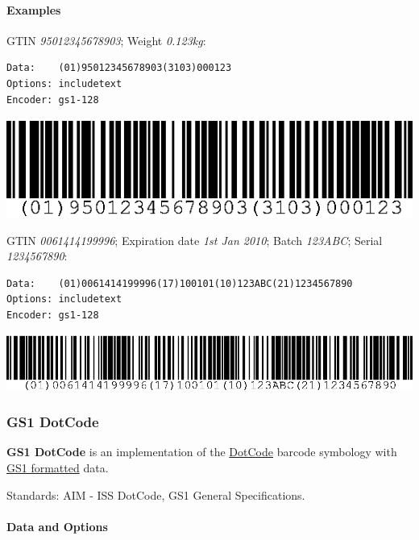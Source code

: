 \hypertarget{examples-22}{%
\paragraph{Examples}\label{examples-22}}

GTIN \emph{95012345678903}; Weight \emph{0.123kg}:

\begin{verbatim}
Data:    (01)95012345678903(3103)000123
Options: includetext
Encoder: gs1-128
\end{verbatim}

\includegraphics{images/ean128-1.eps}

GTIN \emph{0061414199996}; Expiration date \emph{1st Jan 2010}; Batch
\emph{123ABC}; Serial \emph{1234567890}:

\begin{verbatim}
Data:    (01)0061414199996(17)100101(10)123ABC(21)1234567890
Options: includetext
Encoder: gs1-128
\end{verbatim}

\includegraphics{images/ean128-2.eps}

\hypertarget{gs1-dotcode}{%
\subsubsection{GS1 DotCode}\label{gs1-dotcode}}

\textbf{GS1 DotCode} is an implementation of the
\protect\hyperlink{dotcode}{DotCode} barcode symbology with
\protect\hyperlink{gs1-application-identifier-standard-format}{GS1
formatted} data.

Standards: AIM - ISS DotCode, GS1 General Specifications.

\hypertarget{data-and-options-33}{%
\paragraph{Data and Options}\label{data-and-options-33}}

